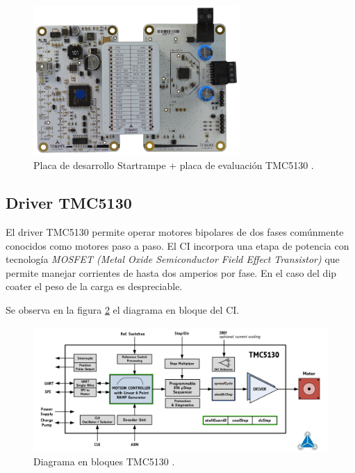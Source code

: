 \begin{figure}[htpb]
\centering 
\includegraphics[width=0.7\textwidth]{./Figures/tmc5130_placa.jpg}
\caption{Placa de desarrollo Startrampe + placa de evaluación TMC5130 \protect\footnotemark.}
\label{fig:tmc5130_placa}
\end{figure}



  
\subsection{Driver TMC5130}
\label{subsection:Driver TMC5130}
El driver TMC5130 permite operar motores bipolares de dos fases comúnmente conocidos como motores paso a paso. El CI incorpora una etapa de potencia con tecnología \textit{MOSFET (Metal Oxide Semiconductor Field Effect Transistor)}  que permite manejar corrientes de hasta dos amperios por fase. En el caso del dip coater el peso de la carga es despreciable.

Se observa en la figura \ref{fig:tmc5130_diagrama} el diagrama en bloque del CI.

\begin{figure}[htpb]
\centering 
\includegraphics[width=1.1\textwidth]{./Figures/tmc5130_diagrama.png}
\caption{Diagrama en bloques TMC5130 \protect\footnotemark.}
\label{fig:tmc5130_diagrama}
\end{figure}

